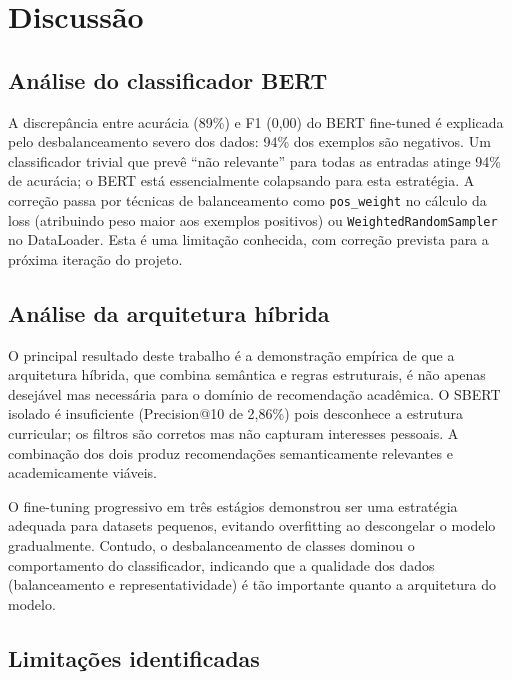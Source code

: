 \documentclass[12pt,a4paper]{article}
\begin{document}
\section{Discussão}

\subsection{Análise do classificador BERT}

A discrepância entre acurácia (89\%) e F1 (0,00) do BERT fine-tuned é explicada pelo desbalanceamento severo dos dados: 94\% dos exemplos são negativos. Um classificador trivial que prevê ``não relevante'' para todas as entradas atinge 94\% de acurácia; o BERT está essencialmente colapsando para esta estratégia. A correção passa por técnicas de balanceamento como \texttt{pos\_weight} no cálculo da loss (atribuindo peso maior aos exemplos positivos) ou \texttt{WeightedRandomSampler} no DataLoader. Esta é uma limitação conhecida, com correção prevista para a próxima iteração do projeto.

\subsection{Análise da arquitetura híbrida}

O principal resultado deste trabalho é a demonstração empírica de que a arquitetura híbrida, que combina semântica e regras estruturais, é não apenas desejável mas necessária para o domínio de recomendação acadêmica. O SBERT isolado é insuficiente (Precision@10 de 2,86\%) pois desconhece a estrutura curricular; os filtros são corretos mas não capturam interesses pessoais. A combinação dos dois produz recomendações semanticamente relevantes e academicamente viáveis.

O fine-tuning progressivo em três estágios demonstrou ser uma estratégia adequada para datasets pequenos, evitando overfitting ao descongelar o modelo gradualmente. Contudo, o desbalanceamento de classes dominou o comportamento do classificador, indicando que a qualidade dos dados (balanceamento e representatividade) é tão importante quanto a arquitetura do modelo.

\subsection{Limitações identificadas}
\end{document}
